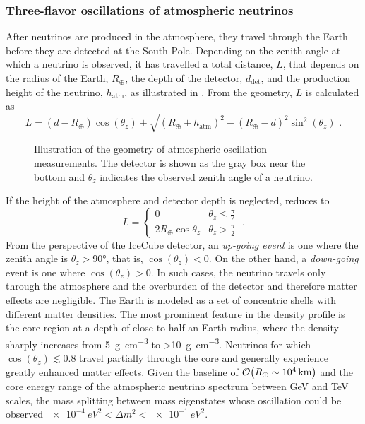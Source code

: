 \subsubsection{Three-flavor oscillations of atmospheric neutrinos}
After neutrinos are produced in the atmosphere, they travel through the Earth before they are detected at the South Pole. Depending on the zenith angle at which a neutrino is observed, it has travelled a total distance, $L$, that depends on the radius of the Earth, $R_\oplus$, the depth of the detector, $d_\mathrm{det}$, and the production height of the neutrino, $h_\mathrm{atm}$, as illustrated in . From the geometry, $L$ is calculated as
\begin{equation}
    L = (d - R_\oplus)\cos(\theta_z) + \sqrt{(R_\oplus + h_\mathrm{atm})^2 - (R_\oplus - d)^2\sin^2(\theta_z)}\;.\label{eq:prop-distance}
\end{equation}
\begin{figure}
    \centering
    
    \caption{Illustration of the geometry of atmospheric oscillation measurements. The detector is shown as the gray box near the bottom and $\theta_z$ indicates the observed zenith angle of a neutrino.\label{fig:atmo-baseline-illustration}}
\end{figure}
If the height of the atmosphere and detector depth is neglected,  reduces to
\begin{equation}
    L =
    \begin{cases}
        0 & \theta_z \leq \frac{\pi}{2} \\
        2 R_\oplus \cos \theta_z & \theta_z > \frac{\pi}{2}
    \end{cases}\;.
\end{equation}
From the perspective of the IceCube detector, an \emph{up-going event} is one where the zenith angle is $\theta_z > \ang{90}$, that is, $\cos(\theta_z) < 0$. On the other hand, a \emph{down-going} event is one where $\cos(\theta_z) > 0$. In such cases, the neutrino travels only through the atmosphere and the overburden of the detector and therefore matter effects are negligible.  The Earth is modeled as a set of concentric shells with different matter densities. The most prominent feature in the density profile is the core region at a depth of close to half an Earth radius, where the density sharply increases from \SI{5}{\gram\per\centi\meter\cubed} to \SI{>10}{\gram\per\centi\meter\cubed}\cite{PREM}. Neutrinos for which $\cos(\theta_z) \lesssim 0.8$ travel partially through the core and generally experience greatly enhanced matter effects. Given the baseline of $\order{R_\oplus\sim\SI{e4}{km}}$ and the core energy range of the atmospheric neutrino spectrum between GeV and TeV scales, the mass splitting between mass eigenstates whose oscillation could be observed $\SI{e-4}{eV^2} < \Delta m^2 < \SI{e-1}{eV^2}$.

